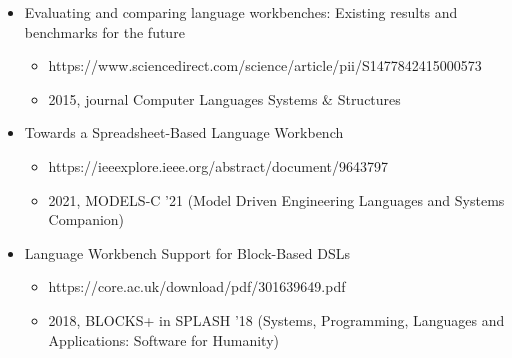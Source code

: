 \begin{itemize}
\begin{itemize}
          \item 
        \end{itemize}
        \item Evaluating and comparing language workbenches: Existing results and benchmarks for the future
        \begin{itemize}
          \item https://www.sciencedirect.com/science/article/pii/S1477842415000573
          \item 2015, journal Computer Languages Systems \& Structures
        \end{itemize}
        \item Towards a Spreadsheet-Based Language Workbench
        \begin{itemize}
          \item https://ieeexplore.ieee.org/abstract/document/9643797
          \item 2021, MODELS-C '21 (Model Driven Engineering Languages and Systems Companion)
        \end{itemize}
        \item Language Workbench Support for Block-Based DSLs
        \begin{itemize}
          \item https://core.ac.uk/download/pdf/301639649.pdf
          \item 2018, BLOCKS+ in SPLASH '18 (Systems, Programming, Languages and Applications: Software for Humanity)
        \end{itemize}
      \end{itemize}
